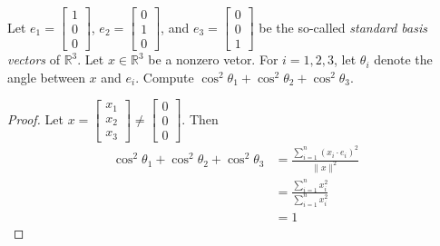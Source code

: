 \begin{exercise} \label{e1.2.7}
    Let \( e_1 = \begin{bmatrix} 1 \\ 0 \\ 0  \end{bmatrix} \), \( e_2 = \begin{bmatrix} 0 \\ 1 \\ 0  \end{bmatrix} \), and \( e_3 = \begin{bmatrix} 0 \\ 0 \\ 1  \end{bmatrix} \) be the so-called \emph{standard basis vectors} of \( \mathbb{R}^3 \). Let \( x \in \mathbb{R}^3 \) be a nonzero vetor. For \( i = 1,2,3 \), let \( \theta_i \) denote the angle between \( x \) and \( e_i \). Compute \( \cos^2{\theta_1} + \cos^2{\theta_2} + \cos^2{\theta_3} \).
    
    \begin{proof}
        Let \( x = \begin{bmatrix} x_1 \\ x_2 \\ x_3 \end{bmatrix} \neq \begin{bmatrix} 0 \\ 0 \\ 0 \end{bmatrix} \). Then
        \begin{align*}
            \cos^2{\theta_1}+\cos^2{\theta_2}+\cos^2{\theta_3} &= \frac{\sum_{i=1}^n (x_i \cdot e_i)^2}{\lVert x \rVert^2} \\
            &= \frac{\sum_{i=1}^n x_i^2}{\sum_{i=1}^n x_i^2} \\
            &= 1
        \end{align*}
    \end{proof}
\end{exercise} %

